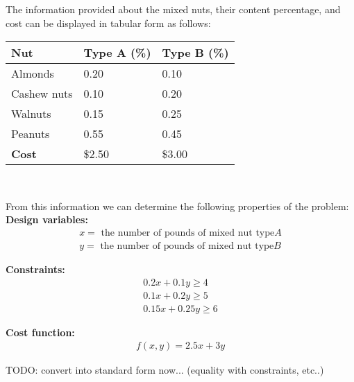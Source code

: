\documentclass[11pt]{article}
\begin{document}
\begin{prob}{1}
\end{prob}
\begin{sol} 

The information provided about the mixed nuts, their content percentage, and cost can be displayed in tabular form as follows: \\

\begin{center}
\begin{tabular}{|l|l|l|}
\hline
\textbf{Nut} & \textbf{Type A (\%)} & \textbf{Type B (\%)} \\
\hline
Almonds & 0.20 & 0.10 \\
Cashew nuts & 0.10 & 0.20 \\
Walnuts & 0.15 & 0.25 \\
Peanuts & 0.55 & 0.45 \\
\hline
\textbf{Cost} & \$2.50 & \$3.00 \\
\hline
\end{tabular}  \\
\end{center}

From this information we can determine the following properties of the problem: \\

\textbf{Design variables:}\\
\begin{eqnarray*}
x = \text{ the number of pounds of mixed nut type} A \\
y = \text{ the number of pounds of mixed nut type} B
\end{eqnarray*}

\textbf{Constraints:} \\
\begin{eqnarray*}
0.2x + 0.1y \geq 4 \\
0.1x + 0.2y \geq 5 \\
0.15x + 0.25y \geq 6
\end{eqnarray*}

\textbf{Cost function:}
\begin{eqnarray*}
f(x,y) = 2.5x + 3y
\end{eqnarray*}

TODO: convert into standard form now... (equality with constraints, etc..)
\end{sol}
\end{document}
